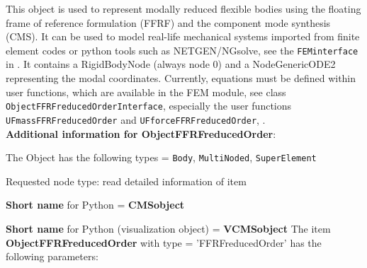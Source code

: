 \label{sec:item:ObjectFFRFreducedOrder}
This object is used to represent modally reduced flexible bodies using the floating frame of reference formulation (FFRF) and the component mode synthesis (CMS). It can be used to model real-life mechanical systems imported from finite element codes or python tools such as NETGEN/NGsolve, see the \texttt{FEMinterface} in . It contains a RigidBodyNode (always node 0) and a NodeGenericODE2 representing the modal coordinates. Currently, equations must be defined within user functions, which are available in the FEM module, see class \texttt{ObjectFFRFreducedOrderInterface}, especially the user functions \texttt{UFmassFFRFreducedOrder} and \texttt{UFforceFFRFreducedOrder}, .\vspace{12pt}
 \\{\bf Additional information for ObjectFFRFreducedOrder}:
\bi
  \item The Object has the following types = \texttt{Body}, \texttt{MultiNoded}, \texttt{SuperElement}
  \item Requested node type: read detailed information of item
  \item {\bf Short name} for Python = {\bf CMSobject}  \item {\bf Short name} for Python (visualization object) = {\bf VCMSobject}\ei
\vspace{12pt} \noindent The item {\bf ObjectFFRFreducedOrder} with type = 'FFRFreducedOrder' has the following parameters:\vspace{-1cm}\\ 

